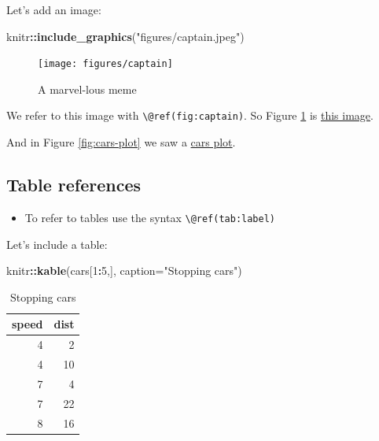 \documentclass[a4paper, twoside]{templates/ociamthesis}
\providecommand{\tightlist}{%
  \setlength{\itemsep}{0pt}\setlength{\parskip}{0pt}}
\newenvironment{Shaded}{\begin{snugshade}}{\end{snugshade}}
\newcommand{\DataTypeTok}[1]{\textcolor[rgb]{0.13,0.29,0.53}{#1}}
\newcommand{\DecValTok}[1]{\textcolor[rgb]{0.00,0.00,0.81}{#1}}
\newcommand{\KeywordTok}[1]{\textcolor[rgb]{0.13,0.29,0.53}{\textbf{#1}}}
\newcommand{\NormalTok}[1]{#1}
\newcommand{\OperatorTok}[1]{\textcolor[rgb]{0.81,0.36,0.00}{\textbf{#1}}}
\newcommand{\StringTok}[1]{\textcolor[rgb]{0.31,0.60,0.02}{#1}}
\renewenvironment{Shaded}
{
  \vspace{4pt}%
  \begin{snugshade}%
}{%
  \end{snugshade}%
  \vspace{4pt}%
}
\begin{document}
Let's add an image:

\begin{Shaded}
\begin{Highlighting}[]
\NormalTok{knitr}\OperatorTok{::}\KeywordTok{include_graphics}\NormalTok{(}\StringTok{"figures/captain.jpeg"}\NormalTok{)}
\end{Highlighting}
\end{Shaded}

\begin{figure}

{\centering \texttt{[image: figures/captain]} 

}

\caption{A marvel-lous meme}\label{fig:captain}
\end{figure}

We refer to this image with \texttt{\textbackslash{}@ref(fig:captain)}.
So Figure \ref{fig:captain} is \protect\hyperlink{fig:captain}{this image}.

And in Figure \ref{fig:cars-plot} we saw a \protect\hyperlink{fig:cars-plot}{cars plot}.

\hypertarget{table-references}{%
\subsection{Table references}\label{table-references}}

\begin{itemize}
\tightlist
\item
  To refer to tables use the syntax \texttt{\textbackslash{}@ref(tab:label)}
\end{itemize}

Let's include a table:

\begin{Shaded}
\begin{Highlighting}[]
\NormalTok{knitr}\OperatorTok{::}\KeywordTok{kable}\NormalTok{(cars[}\DecValTok{1}\OperatorTok{:}\DecValTok{5}\NormalTok{,],}
            \DataTypeTok{caption=}\StringTok{"Stopping cars"}\NormalTok{)}
\end{Highlighting}
\end{Shaded}

\begin{table}

\caption{\label{tab:cars-table2}Stopping cars}
\centering
\begin{tabular}[t]{r|r}
\hline
speed & dist\\
\hline
4 & 2\\
\hline
4 & 10\\
\hline
7 & 4\\
\hline
7 & 22\\
\hline
8 & 16\\
\hline
\end{tabular}
\end{table}
\end{document}
